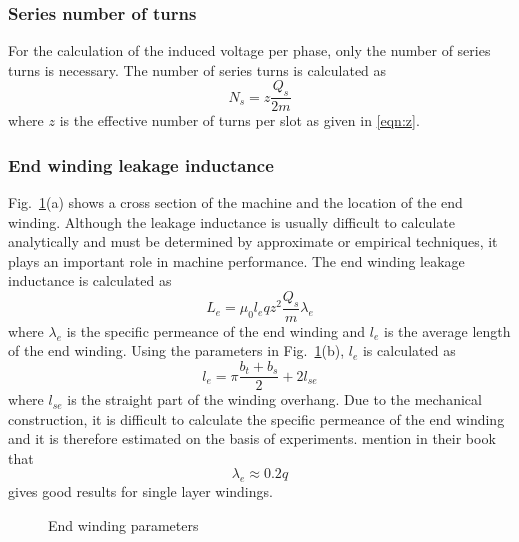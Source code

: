 \subsubsection{Series number of turns}
For the calculation of the induced voltage per phase, only the number of series turns is necessary. The number of series turns is calculated as
\begin{equation}
  \label{eqn:Ns}
  N_s = z\frac{Q_s}{2m}
\end{equation}
where $z$ is the effective number of turns per slot as given in \eqref{eqn:z}.

\subsubsection{End winding leakage inductance}\label{sec:Le}
Fig.~\ref{fig:wend_winding}(a) shows a cross section of the machine and the location of the end winding. Although the leakage inductance is usually difficult to calculate analytically and must be determined by approximate or empirical techniques, it plays an important role in machine performance. The end winding leakage inductance is calculated as
\begin{equation}
  \label{eqn:Lsigma}
  L_e = \mu_0 l_e q z^{2} \frac{Q_s}{m} \lambda_e
\end{equation}
where $\lambda_e$ is the specific permeance of the end winding and $l_e$ is the average length of the end winding. Using the parameters in Fig.~\ref{fig:wend_winding}(b), $l_e$ is calculated as
\begin{equation}
  \label{eqn:le}
  l_e = \pi\frac{b_t+b_s}{2}+2l_{se}
\end{equation} 
where $l_{se}$ is the straight part of the winding overhang. Due to the mechanical construction, it is difficult to calculate the specific permeance of the end winding and it is therefore estimated on the basis of experiments.  \cite{Gieras2002} mention in their book that 
\begin{equation}
  \lambda_e \approx 0.2q
\end{equation}  
gives good results for single layer windings. 
\begin{figure}
	\centering
		
	\caption{End winding parameters}
	\label{fig:wend_winding}
\end{figure}


